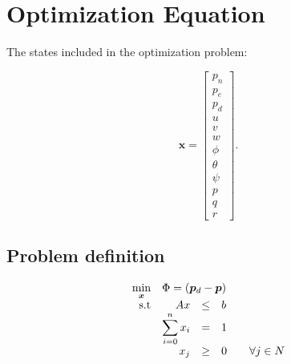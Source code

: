 \section{Optimization Equation}

The states included in the optimization problem:
	
\begin{equation}
	\bm{x} = 
	\begin{bmatrix}
		p_n \\ p_e \\ p_d \\
		u \\ v   \\ w   \\ 
		\phi \\ \theta \\ \psi \\
		p \\ q \\ r
	\end{bmatrix}.
\end{equation}

\subsection{Problem definition}

\begin{equation}
	\begin{array}{rrclcl}
		\displaystyle \min_{\bm{x}} & \multicolumn{3}{l}{\Phi = (\bm{p}_d - \bm{p})} \\
		\textrm{s.t}
		& A x & \leq & b \\
		& \displaystyle \sum_{i=0}^{n} x_i & = & 1 \\
		& x_j & \geq & 0 & & \forall j \in N \\
	\end{array}
\end{equation}